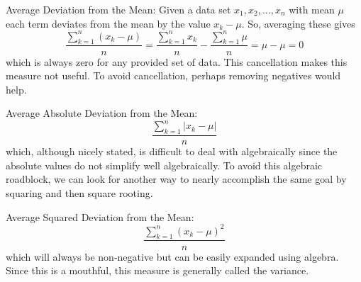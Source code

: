 \documentclass[10pt,]{book}
\theoremstyle{plain}
\theoremstyle{definition}
\theoremstyle{definition}
\numberwithin{equation}{section}
\begin{document}
Average Deviation from the Mean:  Given a data set \(x_1, x_2, ... , x_n\) with mean \(\mu\) each term deviates from the mean by the value \(x_k - \mu\). So, averaging these gives
\begin{equation*} \frac{\sum_{k=1}^n (x_k-\mu)}{n} = \frac{\sum_{k=1}^n x_k}{n} - \frac{\sum_{k=1}^n \mu}{n} = \mu - \mu = 0\end{equation*}
which is always zero for any provided set of data. This cancellation makes this measure not useful. To avoid cancellation, perhaps removing negatives would help.
%
\par
Average Absolute Deviation from the Mean:  
\begin{equation*} \frac{\sum_{k=1}^n \left | x_k-\mu \right |}{n} \end{equation*}
which, although nicely stated, is difficult to deal with algebraically since the absolute values do not simplify well algebraically. To avoid this algebraic roadblock, we can look for another way to nearly accomplish the same goal by squaring and then square rooting. 
%
\par
Average Squared Deviation from the Mean:
\begin{equation*} \frac{\sum_{k=1}^n ( x_k-\mu )^2}{n} \end{equation*}
which will always be non-negative but can be easily expanded using algebra. Since this is a mouthful, this measure is generally called the variance. 
%
\par
\end{document}
